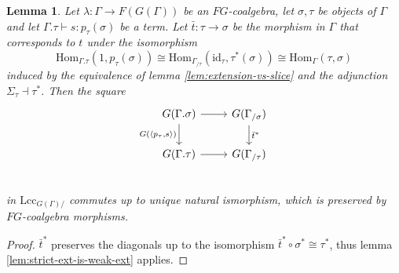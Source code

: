 \documentclass{article}
\newtheorem{lemma}{Lemma}
\theoremstyle{remark}
\theoremstyle{definition}
\begin{document}
\begin{lemma}
  \label{lem:substitution-vs-pullback}
  Let $\lambda : \Gamma \rightarrow F(G(\Gamma))$ be an $FG$-coalgebra, let $\sigma, \tau$ be objects of $\Gamma$ and let $\Gamma.\tau \vdash s : p_\tau(\sigma)$ be a term.
  Let $\bar t : \tau \rightarrow \sigma$ be the morphism in $\Gamma$ that corresponds to $t$ under the isomorphism
  \begin{equation}
    \mathrm{Hom}_{\Gamma.\tau}(1, p_\tau(\sigma)) \cong \mathrm{Hom}_{\Gamma_{/ \tau}}(\mathrm{id}_\tau, \tau^*(\sigma)) \cong \mathrm{Hom}_\Gamma(\tau, \sigma)
  \end{equation}
  induced by the equivalence of lemma \ref{lem:extension-vs-slice} and the adjunction $\Sigma_\tau \dashv \tau^*$.
  Then the square
  \begin{equation}
    \begin{tikzcd}
      G(\Gamma.\sigma) \arrow[r] \arrow[d, "{G(\langle p_\tau, s \rangle)}"'] & G(\Gamma_{/ \sigma}) \arrow[d, "\bar t^*"] \\
      G(\Gamma.\tau) \arrow[r] & G(\Gamma_{/ \tau}) \\
    \end{tikzcd}
  \end{equation}
  in $\mathrm{Lcc}_{G(\Gamma)/ }$ commutes up to unique natural ismorphism, which is preserved by $FG$-coalgebra morphisms.
\end{lemma}
\begin{proof}
  $\bar t^*$ preserves the diagonals up to the isomorphism $\bar t^* \circ \sigma^* \cong \tau^*$, thus lemma \ref{lem:strict-ext-is-weak-ext} applies.
\end{proof}
\end{document}
